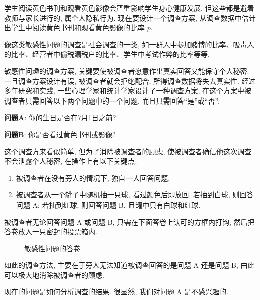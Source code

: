 \begin{example}[敏感性问题调查]
  学生阅读黄色书刊和观看黄色影像会严重影响学生身心健康发展.
  但这些都是避着教师与家长进行的,
  属个人隐私行为.
  现在要设计一个调查方案,
  从调查数据中估计出学生中阅读黄色书刊和观看黄色影像的比率 $p$.
\end{example}

像这类敏感性问题的调查是社会调查的一类,
如一群人中参加赌博的比率、吸毒人的比率、经营者中偷税漏税户的比率、学生中考试作弊的比率等等.

敏感性问趣的调查方案,
关键要使被调查者愿意作出真实回答又能保守个人秘密.
一且调查方案设计有误,
被调查者就会拒绝配合,
所得调查数据将失去真实性.
经过多年研究和实践,
一些心理学家和统计学家设计了一种调查方案,
在这个方案中被调查者只需回答以下两个问题中的一个问题,
而且只需回答“是”或“否”.

\textbf{问题A}:
你的生日是否在7月1日之前?

\textbf{问题B}:
你是否看过黄色书刊或影像?

这个调查方来看似简单,
但为了消除被调查者的顾虑,
使被调查者确信他这次调查不会泄露个人秘密,
在操作上有以下关键点:
\begin{enumerate}
  \item 被调查者在没有旁人的情况下,
  独自一人回答问题.

  \item 被调查者从一个罐子中随机抽一只球,
  看过颜色后即放回.
  若抽到白球,
  则回答问题 A;
  若抽到红球,
  则回答问题 B.
  且罐中只有白球和红球.
\end{enumerate}

被调查者无论回答问题 A 或问题 B,
只需在下面答卷上认可的方框内打钩,
然后把答卷放入一只密封的投票箱内.

\begin{figure}
  \centering
  \caption{敏感性问题的答卷}\label{fig1.4.4}
\end{figure}

如此的调查方法,
主要在于旁人无法知道被调查回答的是问题 A 还是问题 B,
由此可以极大地消除被调查者的顾虑.

现在的问题是如何分析调查的结果.
很显然,
我们对问题 A 是不感兴趣的.

